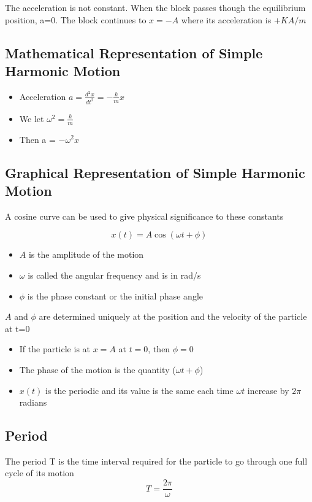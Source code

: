 The acceleration is not constant. When the block passes though the equilibrium position, a=0. The block continues to $x=-A$ where its acceleration is $+KA/m$

\subsection{Mathematical Representation of Simple Harmonic Motion}
\begin{itemize}
	\item Acceleration $a=\frac{d^2x}{dt^2}=-\frac{k}{m}x$
	\item We let $\omega^2=\frac{k}{m}$
	\item Then a = $-\omega^2x$
\end{itemize}

\subsection{Graphical Representation of Simple Harmonic Motion}
A cosine curve can be used to give physical significance to these constants

\[x(t)=A\cos (\omega t+\phi)\]

\begin{itemize}
	\item $A$ is the amplitude of the motion
	\item $\omega$ is called the angular frequency and is in rad/s
	\item $\phi$ is the phase constant or the initial phase angle
\end{itemize}

$A$ and $\phi$ are determined uniquely at the position and the velocity of the particle at t=0
\begin{itemize}
	\item If the particle is at $x=A$ at $t=0$, then $\phi=0$
	\item The phase of the motion is the quantity ($\omega t+\phi$)
	\item $x(t)$ is the periodic and its value is the same each time $\omega t$ increase by $2\pi$ radians
\end{itemize}

\subsection{Period}
The period T is the time interval required for the particle to go through one full cycle of its motion
\[T=\frac{2\pi}{\omega}\]

